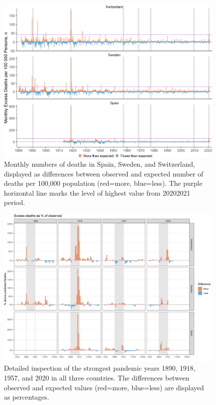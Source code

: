 \documentclass{article}
\begin{document}
	\begin{figure}[H]
		\centering	
		\includegraphics[width=\linewidth]{../Figure_S2b.png}
		\caption{Monthly numbers of deaths in Spain, Sweden, and Switzerland, displayed as differences between observed and expected number of deaths per 100,000 population (red=more, blue=less). The purple horizontal line marks the level of highest value from 20202021 period.}
	\end{figure}

	
	\begin{figure}[H]
		\centering	
		\includegraphics[width=\linewidth]{../Figure_S3b.png}
		\caption{Detailed inspection of the strongest pandemic years 1890, 1918, 1957, and 2020 in all three countries. The differences between observed and expected values (red=more, blue=less) are displayed as percentages.}
	\end{figure}
\end{document}
